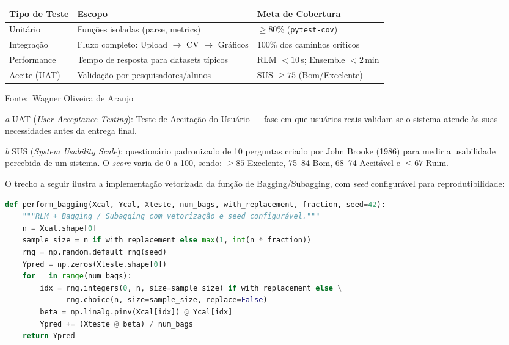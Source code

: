 \documentclass[12pt,a4paper]{article}
\newcommand{\oautor}{Wagner Oliveira de Araujo}
\begin{document}
\begin{quadro}[ht]
\centering
\small
\caption{Estratégia de testes e critérios de aceite}
\label{quadro:testes}
\begin{threeparttable}
\begin{tabularx}{\textwidth}{|l|X|X|} \hline
\textbf{Tipo de Teste} & \textbf{Escopo} & \textbf{Meta de Cobertura} \\ \hline
Unitário & Funções isoladas (parse, metrics) & $\ge 80\%$ (\texttt{pytest-cov}) \\ \hline
Integração & Fluxo completo: Upload $\rightarrow$ CV $\rightarrow$ Gráficos & 100\% dos caminhos críticos \\ \hline
Performance & Tempo de resposta para datasets típicos & RLM $< 10\,$s; Ensemble $< 2\,$min \\ \hline
Aceite (UAT)\tnote{a} & Validação por pesquisadores/alunos & SUS\tnote{b} $\ge 75$ (Bom/Excelente) \\ \hline
\end{tabularx}
\begin{tablenotes}[flushleft]
\footnotesize
\item Fonte:~\oautor
\item[\textit{a}] UAT (\textit{User Acceptance Testing}): Teste de Aceitação do Usuário --- fase em que usuários reais validam se o sistema atende às suas necessidades antes da entrega final.
\item[\textit{b}] SUS (\textit{System Usability Scale}): questionário padronizado de 10 perguntas criado por John Brooke (1986) para medir a usabilidade percebida de um sistema. O \textit{score} varia de 0 a 100, sendo: $\ge 85$ Excelente, 75--84 Bom, 68--74 Aceitável e $\le 67$ Ruim.
\end{tablenotes}
\end{threeparttable}
\end{quadro}

O trecho a seguir ilustra a implementação vetorizada da função de Bagging/Subagging, com \textit{seed} configurável para reprodutibilidade:

\begin{lstlisting}[language=Python]
def perform_bagging(Xcal, Ycal, Xteste, num_bags, with_replacement, fraction, seed=42):
    """RLM + Bagging / Subagging com vetorização e seed configurável."""
    n = Xcal.shape[0]
    sample_size = n if with_replacement else max(1, int(n * fraction))
    rng = np.random.default_rng(seed)
    Ypred = np.zeros(Xteste.shape[0])
    for _ in range(num_bags):
        idx = rng.integers(0, n, size=sample_size) if with_replacement else \
              rng.choice(n, size=sample_size, replace=False)
        beta = np.linalg.pinv(Xcal[idx]) @ Ycal[idx]
        Ypred += (Xteste @ beta) / num_bags
    return Ypred
\end{lstlisting}
\end{document}
